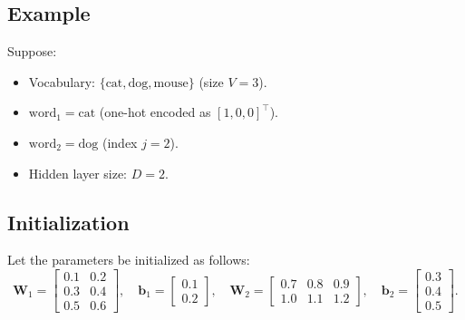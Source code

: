 \begin{notechapter}
\section{Example}
Suppose:
\begin{itemize}
    \item Vocabulary: \(\{ \text{cat}, \text{dog}, \text{mouse} \}\) (size \(V = 3\)).
    \item \(\text{word}_1 = \text{cat}\) (one-hot encoded as \([1, 0, 0]^\top\)).
    \item \(\text{word}_2 = \text{dog}\) (index \(j = 2\)).
    \item Hidden layer size: \( D = 2 \).
\end{itemize}

\subsection{Initialization}
Let the parameters be initialized as follows:
\[
\mathbf{W}_1 = \begin{bmatrix}
0.1 & 0.2 \\
0.3 & 0.4 \\
0.5 & 0.6
\end{bmatrix}, \quad
\mathbf{b}_1 = \begin{bmatrix}
0.1 \\
0.2
\end{bmatrix}, \quad
\mathbf{W}_2 = \begin{bmatrix}
0.7 & 0.8 & 0.9 \\
1.0 & 1.1 & 1.2
\end{bmatrix}, \quad
\mathbf{b}_2 = \begin{bmatrix}
0.3 \\
0.4 \\
0.5
\end{bmatrix}.
\]


\end{notechapter}
